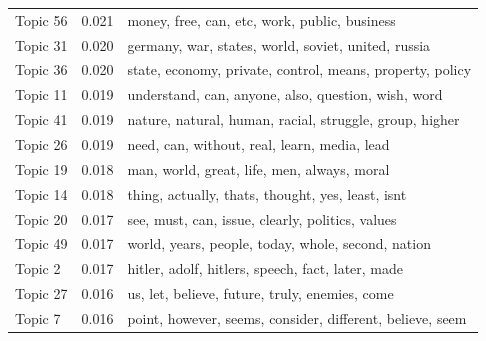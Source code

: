 \documentclass[12pt]{paper}
\begin{document}
\begin{table}[H]
\begin{adjustbox}{width=1\textwidth}
\begin{tabular}{lll}
			Topic 56                           & 0.021                                                  & money, free, can, etc, work, public, business                       \\
			Topic 31                           & 0.020                                                  & germany, war, states, world, soviet, united, russia                 \\
			Topic 36                           & 0.020                                                  & state, economy, private, control, means, property, policy           \\
			Topic 11                           & 0.019                                                  & understand, can, anyone, also, question, wish, word                 \\
			Topic 41                           & 0.019                                                  & nature, natural, human, racial, struggle, group, higher             \\
			Topic 26                           & 0.019                                                  & need, can, without, real, learn, media, lead                        \\
			Topic 19                           & 0.018                                                  & man, world, great, life, men, always, moral                         \\
			Topic 14                           & 0.018                                                  & thing, actually, thats, thought, yes, least, isnt                   \\
			Topic 20                           & 0.017                                                  & see, must, can, issue, clearly, politics, values                    \\
			Topic 49                           & 0.017                                                  & world, years, people, today, whole, second, nation                  \\
			Topic 2                            & 0.017                                                  & hitler, adolf, hitlers, speech, fact, later, made                   \\
			Topic 27                           & 0.016                                                  & us, let, believe, future, truly, enemies, come                      \\
			Topic 7                            & 0.016                                                  & point, however, seems, consider, different, believe, seem           \\

\end{tabular}
\end{adjustbox}
\end{table}
\end{document}
